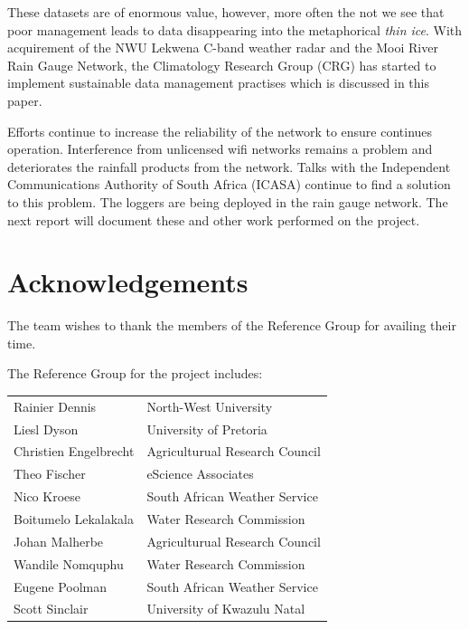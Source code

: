 \documentclass{wrcreport}
\begin{document}
These datasets are of enormous value, however, more often the not we
see that poor management leads to data disappearing into the
metaphorical \textit{thin ice}.  With acquirement of the NWU Lekwena
C-band weather radar and the Mooi River Rain Gauge Network, the
Climatology Research Group (CRG) has started to implement sustainable
data management practises which is discussed in this paper.

Efforts continue to increase the reliability of the network to ensure
continues operation. Interference from unlicensed wifi networks
remains a problem and deteriorates the rainfall products from the
network. Talks with the Independent Communications Authority of South
Africa (ICASA) continue to find a solution to this problem. The
loggers are being deployed in the rain gauge network. The next report
will document these and other work performed on the project.

\pagebreak

\chapter*{Acknowledgements}

The team wishes to thank the members of the Reference Group for
availing their time.

The Reference Group for the project includes:

\begin{tabular}{ l l }
Rainier Dennis & North-West University \\
Liesl Dyson & University of Pretoria \\
Christien Engelbrecht & Agriculturual Research Council \\
Theo Fischer & eScience Associates \\
Nico Kroese & South African Weather Service \\
Boitumelo Lekalakala & Water Research Commission \\
Johan Malherbe &  Agriculturual Research Council \\
Wandile Nomquphu & Water Research Commission \\
Eugene Poolman & South African Weather Service \\
Scott Sinclair & University of Kwazulu Natal \\
\end{tabular}
\clearpage

\dominitoc
\setcounter{tocdepth}{1} %
{\thispagestyle{plain}
  \tableofcontents
\printglossaries
}
\end{document}
